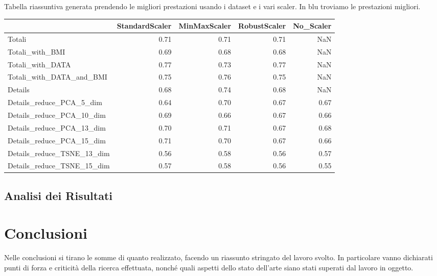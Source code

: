 \documentclass[12pt,italian]{report}
\begin{document}
\newpage
Tabella riassuntiva generata prendendo le migliori prestazioni usando i dataset e i vari scaler. In blu troviamo le prestazioni migliori.
\begin{table}[h]
	\begin{center}
		\begin{adjustbox}{max width=\textwidth}
			\begin{tabular}{lrrrr}
				\toprule
				{} &  StandardScaler &  MinMaxScaler &  RobustScaler &  No\_Scaler \\
				\midrule
				Totali                     &        0.71 &      0.71 &      0.71 &        NaN \\
				Totali\_with\_BMI            &        0.69 &      0.68 &      0.68 &        NaN \\
				Totali\_with\_DATA           &        \cellcolor{blue!25}0.77 &      0.73 &      \cellcolor{blue!25}0.77 &        NaN \\
				Totali\_with\_DATA\_and\_BMI   &        0.75 &      0.76 &      0.75 &        NaN \\
				Details                    &        0.68 &      0.74 &      0.68 &        NaN \\
				Details\_reduce\_PCA\_5\_dim   &        0.64 &      0.70 &      0.67 &   0.67 \\
				Details\_reduce\_PCA\_10\_dim  &        0.69 &      0.66 &      0.67 &   0.66 \\
				Details\_reduce\_PCA\_13\_dim  &        0.70 &      0.71 &      0.67 &   0.68 \\
				Details\_reduce\_PCA\_15\_dim  &        0.71 &      0.70 &      0.67 &   0.66 \\
				Details\_reduce\_TSNE\_13\_dim &        0.56 &      0.58 &      0.56 &   0.57 \\
				Details\_reduce\_TSNE\_15\_dim &        0.57 &      0.58 &      0.56 &   0.55 \\
				\bottomrule
			\end{tabular}
		\end{adjustbox}
	\end{center}
\end{table}




		

\section{Analisi dei  Risultati}



% 
% 
\chapter{Conclusioni}

Nelle conclusioni si tirano le somme di quanto realizzato, facendo un riassunto stringato del lavoro svolto. In particolare vanno dichiarati punti di forza e criticità della ricerca effettuata, nonché quali aspetti dello stato dell'arte siano stati superati dal lavoro in oggetto.

%
%



\end{document}
